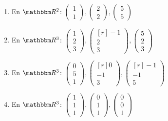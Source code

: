 \begin{enumerate}[resume]
    \item En $ \RR[2]$: $\begin{pmatrix} 1 \\ 1 \end{pmatrix}, \begin{pmatrix} 2 \\ 2 \end{pmatrix}, \begin{pmatrix} 5 \\ 5 \end{pmatrix}$
    \item En $\RR[3]$: $\begin{pmatrix} 1 \\ 2 \\ 3 \end{pmatrix}, \begin{pmatrix*}[r] -1 \\ 2 \\ 3 \end{pmatrix*}, \begin{pmatrix} 5 \\ 2 \\ 3 \end{pmatrix}$
    \item En $\RR[3]$: $\begin{pmatrix} 0 \\ 5 \\ 1 \end{pmatrix}, \begin{pmatrix*}[r] 0 \\ -1 \\ 3 \end{pmatrix*}, \begin{pmatrix*}[r] -1 \\ -1 \\ 5 \end{pmatrix*}$
    \item En $\RR[3]$: $\begin{pmatrix} 1 \\ 1 \\ 1 \end{pmatrix}, \begin{pmatrix} 0 \\ 1 \\ 1 \end{pmatrix}, \begin{pmatrix} 0 \\ 0 \\ 1 \end{pmatrix}$

\end{enumerate}
